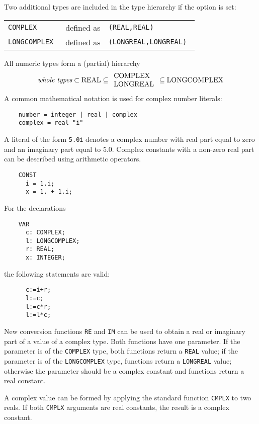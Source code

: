 Two additional types are included in the type hierarchy
if the  option is set:
\begin{center}
\begin{tabular}{lcl}
\tt COMPLEX     & defined as & \tt (REAL,REAL)          \\
\tt LONGCOMPLEX & defined as & \tt (LONGREAL,LONGREAL)  \\
\end{tabular}
\end{center}
All numeric types form a (partial) hierarchy
$$
\mbox{\em whole types} \subset
\mbox{REAL}
\subseteq
\begin{array}{l}
\mbox{COMPLEX}  \\
\mbox{LONGREAL} \\
\end{array}
\subseteq
\mbox{LONGCOMPLEX}
$$
A common mathematical notation is used for complex number
literals:

\verb'    number = integer | real | complex'\\
\verb'    complex = real "i"'

A literal of the form \verb'5.0i' denotes a complex number with real
part equal to zero and an imaginary part equal to $5.0$. Complex
constants with a non-zero real part can be described using
arithmetic operators.

\begin{verbatim}
    CONST
      i = 1.i;
      x = 1. + 1.i;
\end{verbatim}
For the declarations
\begin{verbatim}
    VAR
      c: COMPLEX;
      l: LONGCOMPLEX;
      r: REAL;
      x: INTEGER;
\end{verbatim}
the following statements are valid:
\begin{verbatim}
      c:=i+r;
      l:=c;
      l:=c*r;
      l:=l*c;
\end{verbatim}

New conversion functions {\tt RE} and {\tt IM} can be used to
obtain a real or imaginary part of a value of a complex type. Both
functions have one parameter. If the parameter is of the \verb'COMPLEX'
type, both functions return a \verb'REAL' value; if the parameter is of
the \verb'LONGCOMPLEX' type, functions return a \verb'LONGREAL' value;
otherwise the parameter should be a complex constant and functions return
a real constant.

A complex value can be formed by applying the standard function
{\tt CMPLX} to two reals. If both {\tt CMPLX} arguments are real
constants, the result is a complex constant.


